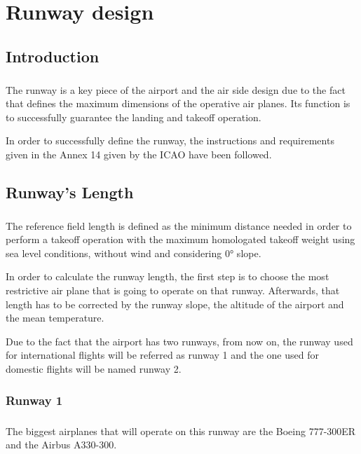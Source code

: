 \chapter{Runway design}

	\section{Introduction}
	\paragraph{} The runway is a key piece of the airport and the air side design due to the fact that defines the maximum dimensions of the operative air planes. Its function is to successfully guarantee the landing and takeoff operation.
	
	In order to successfully define the runway, the instructions and requirements given in the Annex 14 given by the ICAO have been followed. 

	\section{Runway's Length}
	\paragraph{} The reference field length is defined as the minimum distance needed in order to perform a takeoff operation with the maximum homologated takeoff weight using sea level conditions, without wind and considering 0° slope.  

	In order to calculate the runway length, the first step is to choose the most restrictive air plane that is going to operate on that runway. Afterwards, that length has to be corrected by the runway slope, the altitude of the airport and the mean temperature.

	Due to the fact that the airport has two runways, from now on, the runway used for international flights will be referred as runway 1 and the one used for domestic flights will be named runway 2. 
	
		\subsection{Runway 1}
		\paragraph{}The biggest airplanes that will operate on this runway are the Boeing 777-300ER and the Airbus A330-300. 
		
